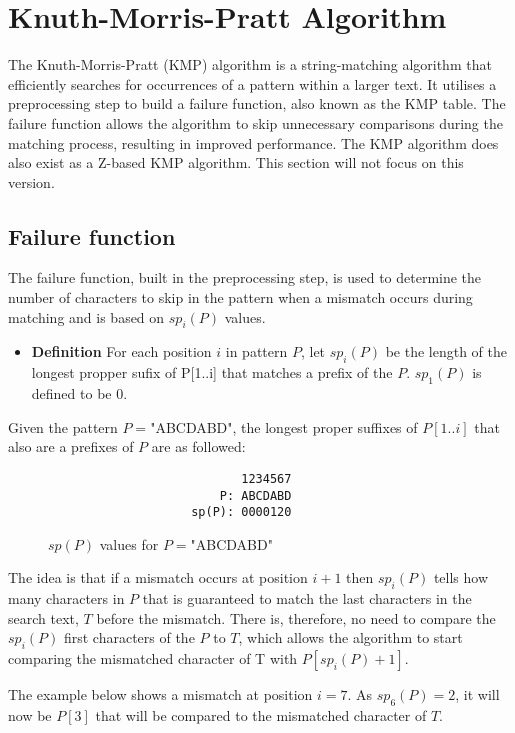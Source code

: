 
\section{Knuth-Morris-Pratt Algorithm}
The Knuth-Morris-Pratt (KMP) algorithm is a string-matching algorithm that efficiently searches for occurrences of a pattern within a larger text. It utilises a preprocessing step to build a failure function, also known as the KMP table. The failure function allows the algorithm to skip unnecessary comparisons during the matching process, resulting in improved performance. The KMP algorithm does also exist as a Z-based KMP algorithm. This section will not focus on this version.

\subsection{Failure function}
The failure function, built in the preprocessing step, is used to determine the number of characters to skip in the pattern when a mismatch occurs during matching and is based on $sp_i(P)$ values.

\begin{itemize}
    \item[] \textbf{Definition} For each position $i$ in pattern $P$, let $sp_i(P)$ be the length of the longest propper sufix of P[1..i] that matches a prefix of the $P$. $sp_1(P)$ is defined to be 0.
\end{itemize}

Given the pattern $P=$"ABCDABD", the longest proper suffixes of $P[1..i]$ that also are a prefixes of $P$ are as followed:

\begin{figure}[H]
\begin{verbatim}
                           1234567
                        P: ABCDABD
                    sp(P): 0000120
\end{verbatim}
\caption{$sp(P)$ values for  $P=$"ABCDABD"}
\label{fig:spP}
\end{figure}

The idea is that if a mismatch occurs at position $i+1$ then $sp_{i}(P)$ tells how many characters in $P$ that is guaranteed to match the last characters in the search text, $T$ before the mismatch. There is, therefore, no need to compare the  $sp_i(P)$ first characters of the $P$ to $T$, which allows the algorithm to start comparing the mismatched character of T with $P[sp_i(P)+1]$.

The example below shows a mismatch at position $i=7$. As $sp_{6}(P) = 2$, it will now be $P[3]$ that will be compared to the mismatched character of $T$. 


